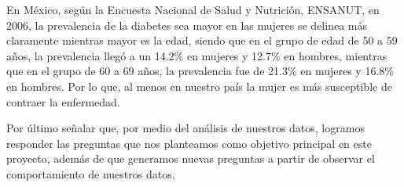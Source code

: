 \documentclass{article}
\begin{document}
En México, según la Encuesta Nacional de Salud y Nutrición, ENSANUT, en 2006, la prevalencia de la diabetes sea mayor en las mujeres se delinea más claramente mientras mayor es la edad, siendo que en el grupo de edad de 50 a 59 años, la prevalencia llegó a un 14.2\% en mujeres y 12.7\% en hombres, mientras que en el grupo de 60 a 69 años, la prevalencia fue de 21.3\% en mujeres y 16.8\% en hombres\cite{diabmx}. Por lo que, al menos en nuestro país la mujer es más susceptible de contraer la enfermedad.

Por último señalar que, por medio del análisis de nuestros datos, logramos responder las preguntas que nos planteamos como objetivo principal en este proyecto, además de que generamos nuevas preguntas a partir de observar el comportamiento de nuestros datos.



\onecolumn{
  
  
}
\end{document}
